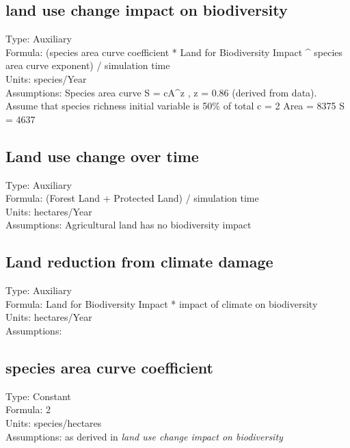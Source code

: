 \documentclass[
  11pt,
]{book}
\begin{document}
\hypertarget{land-use-change-impact-on-biodiversity}{%
\subsection{land use change impact on biodiversity}\label{land-use-change-impact-on-biodiversity}}

Type: Auxiliary\\
Formula: (species area curve coefficient * Land for Biodiversity Impact \^{} species area curve exponent) / simulation time\\
Units: species/Year\\
Assumptions: Species area curve S = cA\^{}z , z = 0.86 (derived from data). Assume that species richness initial variable is 50\% of total c = 2 Area = 8375 S = 4637

\hypertarget{land-use-change-over-time}{%
\subsection{Land use change over time}\label{land-use-change-over-time}}

Type: Auxiliary\\
Formula: (Forest Land + Protected Land) / simulation time\\
Units: hectares/Year\\
Assumptions: Agricultural land has no biodiversity impact

\hypertarget{land-reduction-from-climate-damage}{%
\subsection{Land reduction from climate damage}\label{land-reduction-from-climate-damage}}

Type: Auxiliary\\
Formula: Land for Biodiversity Impact * impact of climate on biodiversity\\
Units: hectares/Year\\
Assumptions:

\hypertarget{species-area-curve-coefficient}{%
\subsection{species area curve coefficient}\label{species-area-curve-coefficient}}

Type: Constant\\
Formula: 2\\
Units: species/hectares\\
Assumptions: as derived in \emph{land use change impact on biodiversity}
\end{document}
